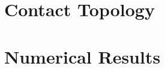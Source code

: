 \documentclass{book}
\theoremstyle{plain}
\theoremstyle{normal}
\begin{document}
    \chapter{Contact Topology}
        
        
        
    \chapter{Numerical Results}
        
        
        
        
    \clearpage
    \nocite{*}
    
    
\end{document}

